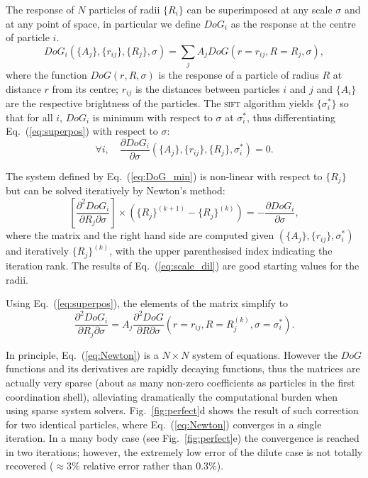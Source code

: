\documentclass[8.5pt,twoside,twocolumn]{article}
\begin{document}
The response of $N$ particles of radii $\lbrace R_i\rbrace$ can be superimposed at any scale $\sigma$ and at any point of space, in particular we define $DoG_i$ as the response at the centre of particle $i$.
\begin{equation}
DoG_i(\lbrace A_j\rbrace, \lbrace r_{ij}\rbrace, \lbrace R_j\rbrace, \sigma) = \sum_j A_j DoG(r=r_{ij}, R=R_j, \sigma),
\label{eq:superpos}
\end{equation}
where the function $DoG(r,R,\sigma)$ is the response of a particle of radius $R$ at distance $r$ from its centre; $r_{ij}$ is the distances between particles $i$ and $j$ and $\lbrace A_i\rbrace$ are the respective brightness of the particles. The \textsc{sift} algorithm yields $\lbrace \sigma_i^*\rbrace$ so that for all $i$, $DoG_i$ is minimum with respect to $\sigma$ at $\sigma_i^*$, thus differentiating Eq.~(\ref{eq:superpos}) with respect to $\sigma$:
\begin{equation}
\forall i,\quad \frac{\partial DoG_i}{\partial\sigma}(\lbrace A_j\rbrace, \lbrace r_{ij}\rbrace, \lbrace R_j\rbrace, \sigma_i^*) = 0.
\label{eq:DoG_min}
\end{equation}

The system defined by Eq.~(\ref{eq:DoG_min}) is non-linear with respect to $\lbrace R_j\rbrace$ but can be solved iteratively by Newton's method:
\begin{equation}
\left[ \frac{\partial^2 DoG_i}{\partial R_j\partial\sigma}\right] \times \left( \lbrace R_j\rbrace^{(k+1)} - \lbrace R_j\rbrace^{(k)} \right) = -\frac{\partial DoG_i}{\partial\sigma},
\label{eq:Newton}
\end{equation}
where the matrix and the right hand side are computed given $(\lbrace A_j\rbrace, \lbrace r_{ij}\rbrace, \sigma_i^*)$ and iteratively $\lbrace R_j\rbrace^{(k)}$, with the upper parenthesised index indicating the iteration rank. The results of Eq.~(\ref{eq:scale_dil}) are good starting values for the radii.

Using Eq.~(\ref{eq:superpos}), the elements of the matrix simplify to
\begin{equation}
\frac{\partial^2 DoG_i}{\partial R_j\partial\sigma} =  A_j \frac{\partial^2 DoG}{\partial R\partial\sigma}(r=r_{ij}, R=R_j^{(k)}, \sigma=\sigma_i^*).
\end{equation}

In principle, Eq.~(\ref{eq:Newton}) is a $N\times N$ system of equations. However the $DoG$ functions and its derivatives are rapidly decaying functions, thus the matrices are actually very sparse (about as many non-zero coefficients as particles in the first coordination shell), alleviating dramatically the computational burden when using sparse system solvers. Fig.~\ref{fig:perfect}d shows the result of such correction for two identical particles, where Eq.~(\ref{eq:Newton}) converges in a single iteration. In a many body case (see Fig.~\ref{fig:perfect}e) the convergence is reached in two iterations; however, the extremely low error of the dilute case is not totally recovered ($\approx 3\%$ relative error rather than $0.3\%$).
\end{document}
